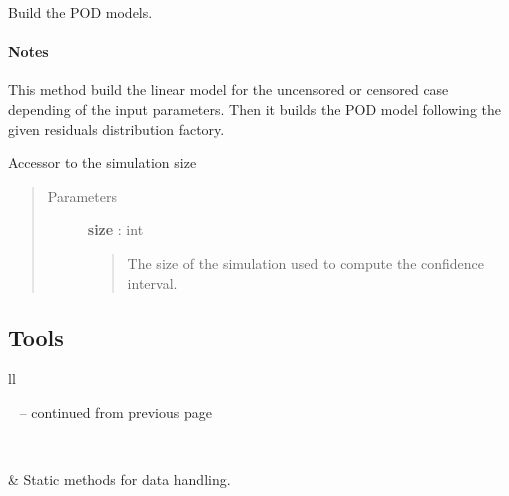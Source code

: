 \documentclass[letterpaper,10pt,english]{sphinxmanual}
\begin{document}
\begin{fulllineitems}
\begin{fulllineitems}
\end{fulllineitems}


\begin{fulllineitems}
\label{_generated/otpod.UnivariateLinearModelPOD:otpod.UnivariateLinearModelPOD.run}
Build the POD models.
\paragraph{Notes}

This method build the linear model for the uncensored or censored case
depending of the input parameters. Then it builds the POD model
following the given residuals distribution factory.

\end{fulllineitems}


\begin{fulllineitems}
\label{_generated/otpod.UnivariateLinearModelPOD:otpod.UnivariateLinearModelPOD.setSimulationSize}
Accessor to the simulation size
\begin{quote}\begin{description}
\item[{Parameters}] \leavevmode
\textbf{size} : int
\begin{quote}

The size of the simulation used to compute the confidence interval.
\end{quote}

\end{description}\end{quote}

\end{fulllineitems}


\end{fulllineitems}



\subsection{Tools}
\label{user_manual:tools}
\begin{longtable}{ll}
\hline
\endfirsthead

%
{{\textsf{\tablename\ \thetable{} -- continued from previous page}}} \\
\hline
\endhead

\hline {} \\ \hline
\endfoot

\endlastfoot


{\hyperref[_generated/otpod.DataHandling:otpod.DataHandling]{\emph{}}}
 & 
Static methods for data handling.
\\
\hline\end{longtable}
\end{document}
